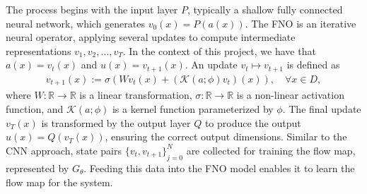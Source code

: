 The process begins with the input layer $P$, typically a shallow fully connected neural network, which generates $v_0(x) = P(a(x))$.
The FNO is an iterative neural operator, applying several updates to compute intermediate representations $v_1, v_2, \ldots, v_T$.
In the context of this project, we have that $a(x) = v_t(x)$ and $u(x) = v_{t+1}(x)$.
An update $v_t \mapsto v_{t+1}$ is defined as
\begin{align}
    v_{t+1}(x) := \sigma \left( W v_t(x) + \left( \mathcal{K}(a;\phi)v_t \right) (x) \right), \quad \forall x \in D,
\end{align}
where $W: \mathbb{R} \to \mathbb{R}$ is a linear transformation, $\sigma: \mathbb{R} \to \mathbb{R}$ is a non-linear activation function, and $\mathcal{K}(a;\phi)$ is a kernel function parameterized by $\phi$.
The final update $v_T(x)$ is transformed by the output layer $Q$ to produce the output $u(x) = Q(v_T(x))$, ensuring the correct output dimensions.
Similar to the CNN approach, state pairs ${\{v_t, v_{t+1}\}}_{j=0}^N$ are collected for training the flow map, represented by $G_{\theta}$.
Feeding this data into the FNO model enables it to learn the flow map for the system.

